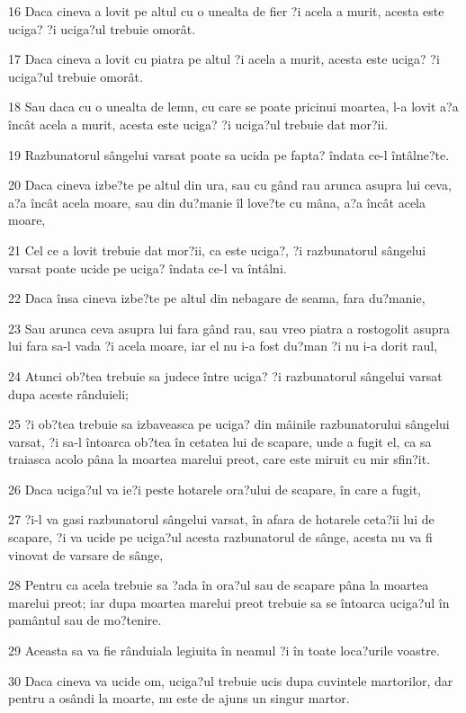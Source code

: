 \par 16 Daca cineva a lovit pe altul cu o unealta de fier ?i acela a murit, acesta este uciga? ?i uciga?ul trebuie omorât.
\par 17 Daca cineva a lovit cu piatra pe altul ?i acela a murit, acesta este uciga? ?i uciga?ul trebuie omorât.
\par 18 Sau daca cu o unealta de lemn, cu care se poate pricinui moartea, l-a lovit a?a încât acela a murit, acesta este uciga? ?i uciga?ul trebuie dat mor?ii.
\par 19 Razbunatorul sângelui varsat poate sa ucida pe fapta? îndata ce-l întâlne?te.
\par 20 Daca cineva izbe?te pe altul din ura, sau cu gând rau arunca asupra lui ceva, a?a încât acela moare, sau din du?manie îl love?te cu mâna, a?a încât acela moare,
\par 21 Cel ce a lovit trebuie dat mor?ii, ca este uciga?, ?i razbunatorul sângelui varsat poate ucide pe uciga? îndata ce-l va întâlni.
\par 22 Daca însa cineva izbe?te pe altul din nebagare de seama, fara du?manie,
\par 23 Sau arunca ceva asupra lui fara gând rau, sau vreo piatra a rostogolit asupra lui fara sa-l vada ?i acela moare, iar el nu i-a fost du?man ?i nu i-a dorit raul,
\par 24 Atunci ob?tea trebuie sa judece între uciga? ?i razbunatorul sângelui varsat dupa aceste rânduieli;
\par 25 ?i ob?tea trebuie sa izbaveasca pe uciga? din mâinile razbunatorului sângelui varsat, ?i sa-l întoarca ob?tea în cetatea lui de scapare, unde a fugit el, ca sa traiasca acolo pâna la moartea marelui preot, care este miruit cu mir sfin?it.
\par 26 Daca uciga?ul va ie?i peste hotarele ora?ului de scapare, în care a fugit,
\par 27 ?i-l va gasi razbunatorul sângelui varsat, în afara de hotarele ceta?ii lui de scapare, ?i va ucide pe uciga?ul acesta razbunatorul de sânge, acesta nu va fi vinovat de varsare de sânge,
\par 28 Pentru ca acela trebuie sa ?ada în ora?ul sau de scapare pâna la moartea marelui preot; iar dupa moartea marelui preot trebuie sa se întoarca uciga?ul în pamântul sau de mo?tenire.
\par 29 Aceasta sa va fie rânduiala legiuita în neamul ?i în toate loca?urile voastre.
\par 30 Daca cineva va ucide om, uciga?ul trebuie ucis dupa cuvintele martorilor, dar pentru a osândi la moarte, nu este de ajuns un singur martor.
